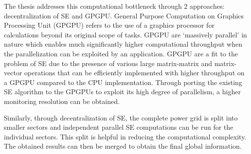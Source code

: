 \documentclass[thesis.tex]{subfiles}
\begin{document}
The thesis addresses this computational bottleneck through 2 approaches: decentralization of SE and GPGPU. General Purpose Computation on Graphics Processing Unit (GPGPU) refers to the use of a graphics processor for calculations beyond its original scope of tasks. GPGPU are ‘massively parallel’ in nature which enables much significantly higher computational throughput when the parallelization can be exploited by an application. GPGPU are a fit to the problem of SE due to the presence of various large matrix-matrix and matrix-vector operations that can be efficiently implemented with higher throughput on a GPGPU compared to the CPU implementation. Through porting the existing SE algorithm to the GPGPUs to exploit its high degree of parallelism, a higher monitoring resolution can be obtained. 

Similarly, through decentralization of SE, the complete power grid is split into smaller sectors and independent parallel SE computations can be run for the individual sectors. This split is helpful in reducing the computational complexity. The obtained results can then be merged to obtain the final global information.

\end{document}
